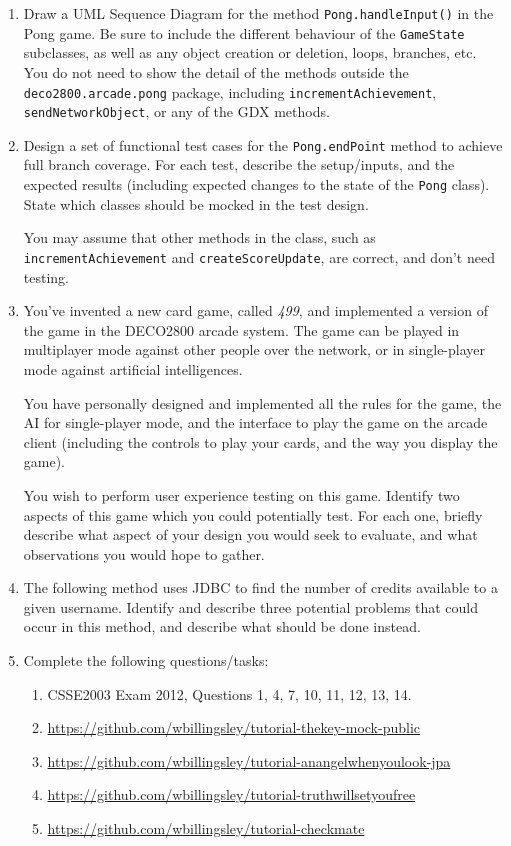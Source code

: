 \documentclass[a4paper,11pt]{article}
\begin{document}
\begin{enumerate}
\item
Draw a UML Sequence Diagram for the method
{\tt Pong.handleInput()} in the Pong game.
Be sure to include the different behaviour of the {\tt GameState} subclasses,
as well as any object creation or deletion, loops, branches, etc.
You do not need to show the detail of the methods outside the
{\tt deco2800.arcade.pong} package, including
{\tt incrementAchievement}, {\tt sendNetworkObject}, or any of the GDX methods.

\item
Design a set of functional test cases for the {\tt Pong.endPoint} method to
achieve full branch coverage. For each test, describe the setup/inputs, and
the expected results (including expected changes to the state of the {\tt Pong}
class). State which classes should be mocked in the test design.

You may assume that other methods in the class, such as
{\tt incrementAchievement} and {\tt createScoreUpdate}, are correct, and don't
need testing.

\item
You've invented a new card game, called
{\em 499}, and implemented a version of the game in the DECO2800
arcade system. The game can be played in multiplayer mode against other people
over the network, or in single-player mode against artificial intelligences.

You have personally designed and implemented all the rules for the game, the
AI for single-player mode, and the interface to play the game on the
arcade client (including the controls to play your cards, and the way you
display the game).

You wish to perform user experience testing on this game. Identify two aspects
of this game which you could potentially test. For each one, briefly describe
what aspect of your design you would seek to evaluate, and what observations
you would hope to gather.

\item
The following method uses JDBC to find the number of credits available to a
given username. Identify and describe three potential problems that could occur
in this method, and describe what should be done instead.



\item
Complete the following questions/tasks:
\begin{enumerate}
\item
CSSE2003 Exam 2012, Questions 1, 4, 7, 10, 11, 12, 13, 14.
\item
\url{https://github.com/wbillingsley/tutorial-thekey-mock-public}
\item
\url{https://github.com/wbillingsley/tutorial-anangelwhenyoulook-jpa}
\item
\url{https://github.com/wbillingsley/tutorial-truthwillsetyoufree}
\item
\url{https://github.com/wbillingsley/tutorial-checkmate}
\end{enumerate}

\end{enumerate}
\end{document}
